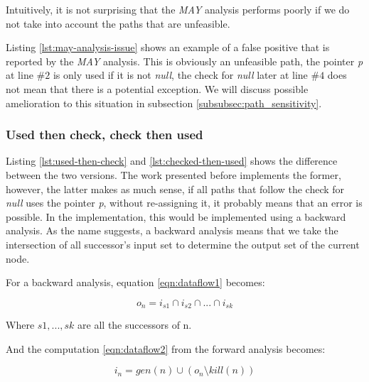 Intuitively, it is not surprising that the \emph{MAY} analysis performs poorly if we do not take into account the paths that are unfeasible.



Listing \ref{lst:may-analysis-issue} shows an example of a false positive that is reported by the \emph{MAY} analysis. 
This is obviously an unfeasible path, the pointer \emph{p} at line $\#2$ is only used if it is not \emph{null}, the check for \emph{null} later at line $\#4$ does not mean that there is a potential exception.
We will discuss possible amelioration to this situation in subsection \ref{subsubsec:path_sensitivity}.

\subsubsection{Used then check, check then used}
\label{subsubsec:used_then_check_check_then_used}




Listing \ref{lst:used-then-check} and \ref{lst:checked-then-used} shows the difference between the two versions.
The work presented before implements the former, however, the latter makes as much sense, if all paths that follow the check for \emph{null} uses the pointer \emph{p}, without re-assigning it, it probably means that an error is possible.
In the implementation, this would be implemented using a backward analysis. 
As the name suggests, a backward analysis means that we take the intersection of all successor’s input set to determine the output set of the current node. 

For a backward analysis, equation \ref{eqn:dataflow1} becomes:

\begin{equation}\label{eqn:checkthenused1}
o_{n} = i_{s1}  \cap   i_{s2}  \cap  ... \cap   i_{sk}
\end{equation}

Where $s1, ..., sk$ are all the successors of n.

And the computation \ref{eqn:dataflow2} from the forward analysis becomes:

\begin{equation}\label{eqn:checkthenused2}
i_{n} = gen(n)  \cup   (o_{n} \setminus kill(n))
\end{equation}

